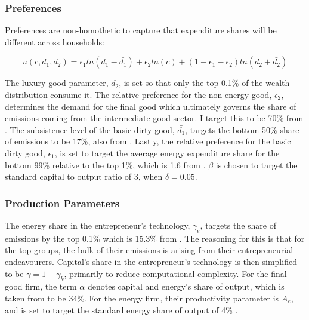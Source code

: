 \documentclass[12pt,a4paper]{article}
\begin{document}
\subsubsection*{Preferences}

Preferences are non-homothetic to capture that expenditure shares will be different across households:

\[ u(c,d_{1},d_{2})=\epsilon_{1} ln(d_{1}-\bar{d_{1}})+\epsilon_{2} ln(c)+(1-\epsilon_{1}-\epsilon_{2})ln(d_{2}+\bar{d_{2}}) \]

\hspace*{6mm} The luxury good parameter, $\bar{d_2}$, is set so that only the top 0.1\% of the wealth distribution consume it. The relative preference for the non-energy good, $\epsilon_2$, determines the demand for the final good which ultimately governs the share of emissions coming from the intermediate good sector. I target this to be 70\% from \cite{chancelandrehm}. The subsistence level of the basic dirty good, $\bar{d_1}$, targets the bottom 50\% share of emissions to be 17\%, also from \cite{chancelandrehm}. Lastly, the relative preference for the basic dirty good, $\epsilon_1$, is set to target the average energy expenditure share for the bottom 99\% relative to the top 1\%, which is 1.6 from \cite{starr2023assessing}.  $\beta$ is chosen to target the standard capital to output ratio of 3, when $\delta=0.05.$

\subsubsection*{Production Parameters}
\hspace*{6mm} The energy share in the entrepreneur's technology, $\gamma_e$, targets the share of emissions by the top 0.1\% which is 15.3\% from  \cite{chancelandrehm}. The reasoning for this is that for the top groups, the bulk of their emissions is arising from their entrepreneurial endeavourers. Capital's share in the entrepreneur's technology is then simplified to be $\gamma = 1-\gamma_k$, primarily to reduce computational complexity. For the final good firm, the term $\alpha$ denotes capital and energy's share of output, which is taken from \cite{golosov2014optimal} to be 34\%. For the energy firm, their productivity parameter is $A_e$, and is set to target the standard energy share of output of 4\% .
\end{document}
